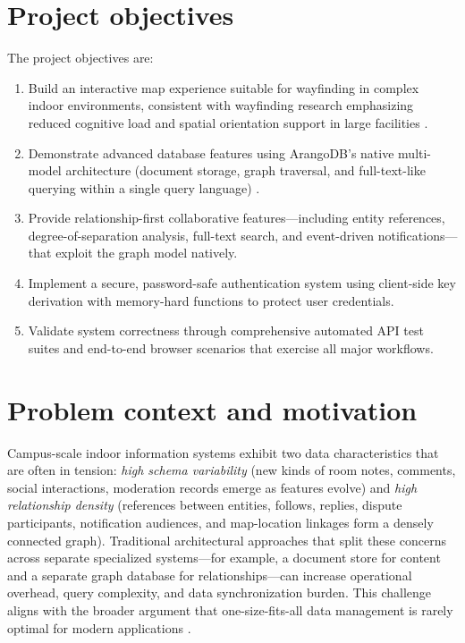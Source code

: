 \documentclass[13pt,a4paper]{report}
\begin{document}
\section{Project objectives}
The project objectives are:
\begin{enumerate}[label=\arabic*.]
    \item Build an interactive map experience suitable for wayfinding in complex indoor environments, consistent with wayfinding research emphasizing reduced cognitive load and spatial orientation support in large facilities \cite{zimmerman2006wayfinding}.
    \item Demonstrate advanced database features using ArangoDB's native multi-model architecture (document storage, graph traversal, and full-text-like querying within a single query language) \cite{arangodb_multimodel}.
    \item Provide relationship-first collaborative features---including entity references, degree-of-separation analysis, full-text search, and event-driven notifications---that exploit the graph model natively.
    \item Implement a secure, password-safe authentication system using client-side key derivation with memory-hard functions to protect user credentials.
    \item Validate system correctness through comprehensive automated API test suites and end-to-end browser scenarios that exercise all major workflows.
\end{enumerate}

\section{Problem context and motivation}
Campus-scale indoor information systems exhibit two data characteristics that are often in tension: \emph{high schema variability} (new kinds of room notes, comments, social interactions, moderation records emerge as features evolve) and \emph{high relationship density} (references between entities, follows, replies, dispute participants, notification audiences, and map-location linkages form a densely connected graph). Traditional architectural approaches that split these concerns across separate specialized systems---for example, a document store for content and a separate graph database for relationships---can increase operational overhead, query complexity, and data synchronization burden. This challenge aligns with the broader argument that one-size-fits-all data management is rarely optimal for modern applications \cite{stonebraker2005onesize}.
\end{document}
